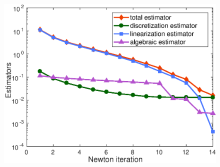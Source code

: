 \documentclass{beamer}
\begin{document}
\begin{frame}
\begin{figure}
\begin{minipage}[c]{.32\linewidth}
   \includegraphics[width=\textwidth]{fig_article/adapt_inexact_resolution_estimators_newton_iter_Hmax_015.eps}     
\end{minipage}\hfill
\end{figure}
\end{frame}
\end{document}
